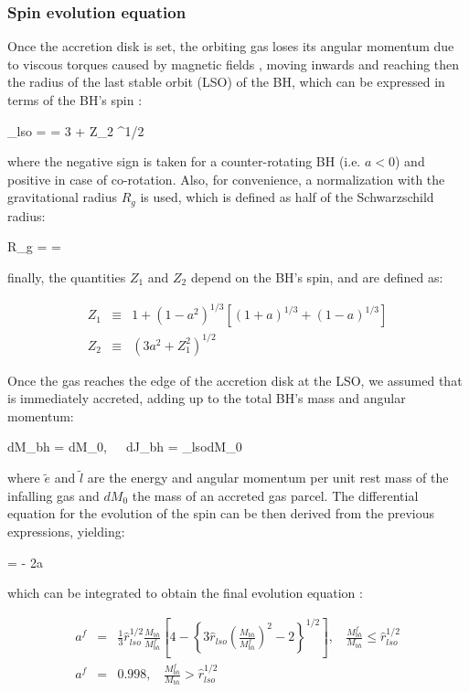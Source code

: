 \documentclass[a4,useAMS,usenatbib,usegraphicx,12pt]{article}
\begin{document}
\subsubsection{Spin evolution equation}

Once the accretion disk is set, the orbiting gas loses its angular momentum due to viscous torques
caused by magnetic fields \citep{Lynden-Bell1969}, moving inwards and reaching then the radius of the 
last stable orbit (LSO) of the BH, which can be expressed in terms of the BH's spin \citep{Bardeen1972}:

{ _{lso} =  = 3 + Z_2 \pm [ (3-Z_1)(3+Z_1+2Z_2) ]^{1/2} }

where the negative sign is taken for a counter-rotating BH (i.e. $a<0$) and positive in case of 
co-rotation. Also, for convenience, a normalization with the gravitational radius $R_g$ is used, which 
is defined as half of the Schwarzschild radius:

{ R_g =  =  }

finally, the quantities $Z_1$ and $Z_2$ depend on the BH's spin, and are defined as:

\begin{eqnarray}
Z_1 &\equiv& 1 + (1-a^2)^{1/3}\left[ (1+a)^{1/3} + (1-a)^{1/3} \right] \\
Z_2 &\equiv& ( 3a^2 + Z_1^2 )^{1/2}
\end{eqnarray}

Once the gas reaches the edge of the accretion disk at the LSO, we assumed that is immediately accreted,
adding up to the total BH's mass and angular momentum:

{ dM_{bh} = dM_0,\ \ \ dJ_{bh} = _{lso}dM_0 }

where $\tilde{e}$ and $\tilde{l}$ are the energy and angular momentum per unit rest mass of the infalling
gas and $dM_0$ the mass of an accreted gas parcel. The differential equation for the evolution of the spin 
can be then derived from the previous expressions, yielding:

{  =  - 2a }

which can be integrated to obtain the final evolution equation \citep{Bardeen1970}:

\begin{eqnarray}
\label{eq:SpinEvol}
a^f  & = & \frac{1}{3}\hat{r}_{lso}^{1/2}\frac{M_{bh}}{M^f_{bh}}\left[ 4 - \left\{ 3\hat{r}_{lso}\left(\frac{M_{bh}}{M^f_{bh}}\right)^2 - 2 \right\}^{1/2} \right],
    \ \ \ \ \frac{M^f_{bh}}{M_{bh}} \leq \hat{r}_{lso}^{1/2} \\
\nonumber
a^f  & = & 0.998, \ \ \ \ \frac{M^f_{bh}}{M_{bh}} > \hat{r}_{lso}^{1/2}
\end{eqnarray}
\end{document}
